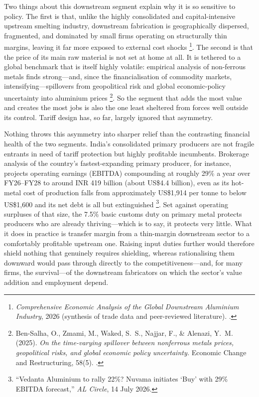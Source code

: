 \documentclass[11pt, a4paper]{article}
\numberwithin{figure}{section}
\numberwithin{table}{section}
\begin{document}
Two things about this downstream segment explain why it is so sensitive to policy. The first is that, unlike the highly consolidated and capital-intensive upstream smelting industry, downstream fabrication is geographically dispersed, fragmented, and dominated by small firms operating on structurally thin margins, leaving it far more exposed to external cost shocks \cite{costreg2026}\footnote{\textit{Comprehensive Economic Analysis of the Global Downstream Aluminium Industry}, 2026 (synthesis of trade data and peer-reviewed literature). \cite{costreg2026}.}. The second is that the price of its main raw material is not set at home at all. It is tethered to a global benchmark that is itself highly volatile: empirical analysis of non-ferrous metals finds strong---and, since the financialisation of commodity markets, intensifying---spillovers from geopolitical risk and global economic-policy uncertainty into aluminium prices \cite{bensalha2025}\footnote{Ben-Salha, O., Zmami, M., Waked, S.~S., Najjar, F., \& Alenazi, Y.~M. (2025). \textit{On the time-varying spillover between nonferrous metals prices, geopolitical risks, and global economic policy uncertainty.} Economic Change and Restructuring, 58(5). \cite{bensalha2025}.}. So the segment that adds the most value and creates the most jobs is also the one least sheltered from forces well outside its control. Tariff design has, so far, largely ignored that asymmetry. 

Nothing throws this asymmetry into sharper relief than the contrasting financial health of the two segments. India's consolidated primary producers are not fragile entrants in need of tariff protection but highly profitable incumbents. Brokerage analysis of the country's fastest-expanding primary producer, for instance, projects operating earnings (EBITDA) compounding at roughly 29\% a year over FY26--FY28 to around INR 419 billion (about US\$4.4 billion), even as its hot-metal cost of production falls from approximately US\$1,914 per tonne to below US\$1,600 and its net debt is all but extinguished \cite{alcircle2026}\footnote{``Vedanta Aluminium to rally 22\%? Nuvama initiates `Buy' with 29\% EBITDA forecast,'' \textit{AL Circle}, 14 July 2026.}. Set against operating surpluses of that size, the 7.5\% basic customs duty on primary metal protects producers who are already thriving---which is to say, it protects very little. What it does in practice is transfer margin from a thin-margin downstream sector to a comfortably profitable upstream one. Raising input duties further would therefore shield nothing that genuinely requires shielding, whereas rationalising them downward would pass through directly to the competitiveness---and, for many firms, the survival---of the downstream fabricators on which the sector's value addition and employment depend.
\end{document}

